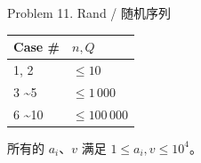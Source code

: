 \documentclass[UTF8]{beamer}
\begin{document}
\begin{frame}{Problem 11. Rand / 随机序列}

\begin{tabularx}{\textwidth}{X|X} \hline
Case \# & $n, Q$ \\ \hline \hline
1, 2                 & $\leq 10$       \\ \hline
3 \textasciitilde 5  & $\leq 1\,000$   \\ \hline
6 \textasciitilde 10 & $\leq 100\,000$ \\ \hline
\end{tabularx}
\newline \newline

所有的 $a_i$、$v$ 满足 $1 \leq a_i, v \leq 10^4$。

\end{frame}
\end{document}
